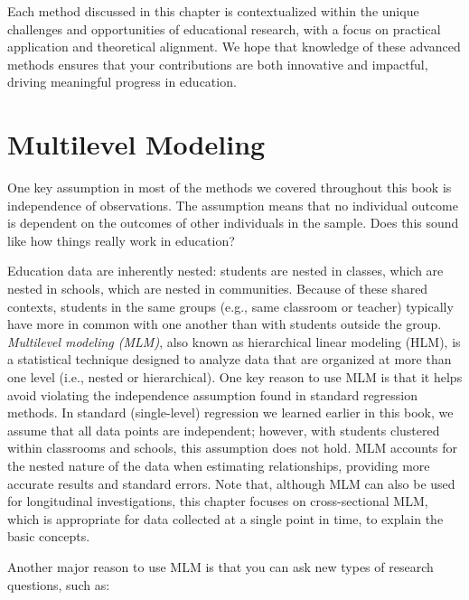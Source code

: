 \documentclass[
  letterpaper,
  DIV=11,
  numbers=noendperiod]{scrreprt}
\begin{document}
Each method discussed in this chapter is contextualized within the
unique challenges and opportunities of educational research, with a
focus on practical application and theoretical alignment. We hope that
knowledge of these advanced methods ensures that your contributions are
both innovative and impactful, driving meaningful progress in education.

\section{Multilevel Modeling}\label{multilevel-modeling}

One key assumption in most of the methods we covered throughout this
book is independence of observations. The assumption means that no
individual outcome is dependent on the outcomes of other individuals in
the sample. Does this sound like how things really work in education?

Education data are inherently nested: students are nested in classes,
which are nested in schools, which are nested in communities. Because of
these shared contexts, students in the same groups (e.g., same classroom
or teacher) typically have more in common with one another than with
students outside the group. \emph{Multilevel modeling (MLM)}, also known
as hierarchical linear modeling (HLM), is a statistical technique
designed to analyze data that are organized at more than one level
(i.e., nested or hierarchical). One key reason to use MLM is that it
helps avoid violating the independence assumption found in standard
regression methods. In standard (single-level) regression we learned
earlier in this book, we assume that all data points are independent;
however, with students clustered within classrooms and schools, this
assumption does not hold. MLM accounts for the nested nature of the data
when estimating relationships, providing more accurate results and
standard errors. Note that, although MLM can also be used for
longitudinal investigations, this chapter focuses on cross-sectional
MLM, which is appropriate for data collected at a single point in time,
to explain the basic concepts.

Another major reason to use MLM is that you can ask new types of
research questions, such as:
\end{document}
